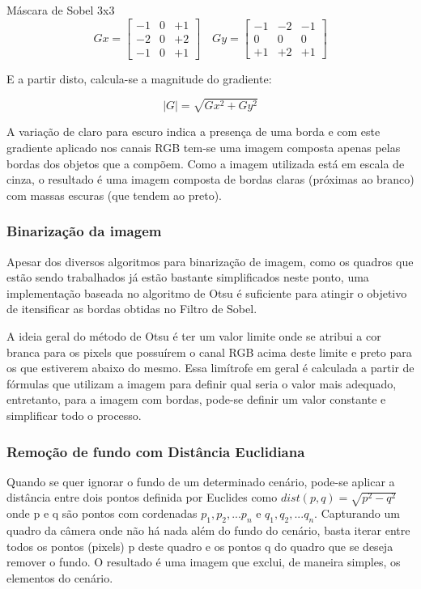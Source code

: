 \documentclass{sciposter}
\begin{document}
\begin{multicols}{3}
\begin{center}{Máscara de Sobel 3x3}
$$
Gx=\left[\begin{array}{rrr}
-1&0&+1\\
-2&0&+2 \\
-1&0&+1
\end{array}\right]\quad
Gy=\left[\begin{array}{ccc}
-1&-2&-1\\
0& 0& 0 \\
+1&+2&+1
\end{array}\right]
$$
\end{center}

E a partir disto, calcula-se a magnitude do gradiente:

$$
|G|=\sqrt{Gx^2 + Gy^2}
$$	

A variação de claro para escuro indica a presença de uma borda e com este gradiente aplicado nos canais RGB tem-se uma imagem composta apenas pelas bordas dos objetos que a compõem. Como a imagem utilizada está em escala de cinza, o resultado é uma imagem composta de bordas claras (próximas ao branco) com massas escuras (que tendem ao preto).

\subsubsection{Binarização da imagem}

Apesar dos diversos algoritmos para binarização de imagem, como os quadros que estão sendo trabalhados já estão bastante simplificados neste ponto, uma implementação baseada no algoritmo de Otsu é suficiente para atingir o objetivo de itensificar as bordas obtidas no Filtro de Sobel.

A ideia geral do método de Otsu é ter um valor limite onde se atribui a cor branca para os pixels que possuírem o canal RGB acima deste limite e preto para os que estiverem abaixo do mesmo. Essa limítrofe em geral é calculada a partir de fórmulas que utilizam a imagem para definir qual seria o valor mais adequado, entretanto, para a imagem com bordas, pode-se definir um valor constante e simplificar todo o processo.

\subsubsection{Remoção de fundo com Distância Euclidiana}

Quando se quer ignorar o fundo de um determinado cenário, pode-se aplicar a distância entre dois pontos definida por Euclides como $dist(p, q) = \sqrt{p^2 - q^2}$ onde p e q são pontos com cordenadas $p_{1}, p_{2}, ... p_{n}$ e $q_{1}, q_{2}, ... q_{n}$. Capturando um quadro da câmera onde não há nada além do fundo do cenário, basta iterar entre todos os pontos (pixels) p deste quadro e os pontos q do quadro que se deseja remover o fundo. O resultado é uma imagem que exclui, de maneira simples, os elementos do cenário.


\end{multicols}
\end{document}
